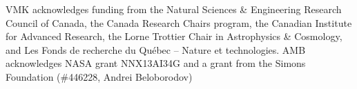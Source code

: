 

VMK acknowledges funding from the Natural Sciences \& Engineering Research Council
of Canada, the Canada Research Chairs program, the Canadian Institute for
Advanced Research, the Lorne Trottier Chair in Astrophysics \& Cosmology,
and Les Fonds de recherche du Qu\'ebec -- Nature et technologies.
AMB acknowledges NASA grant NNX13AI34G and a grant from the Simons Foundation 
(\#446228, Andrei Beloborodov) 
